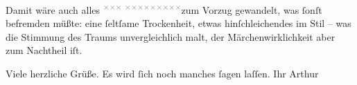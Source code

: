 \pstart
           Damit wäre auch alles \substVorne{}\textsuperscript{\textcolor{gray}{×}\-\textcolor{gray}{×}\-\textcolor{gray}{×}{ }\textcolor{gray}{×}\-\textcolor{gray}{×}\-\textcolor{gray}{×}\-\textcolor{gray}{×}\-\textcolor{gray}{×}\-\textcolor{gray}{×}\-\textcolor{gray}{×}\-\textcolor{gray}{×}\-\textcolor{gray}{×}}\substDazwischen{}zum Vorzug gewandelt\substHinten{}, was ſonſt befremden müßte: eine ſeltſame Trockenheit, etwas
               hinſchleichendes im Stil – was die Stimmung des Traums unvergleichlich malt, der
               Märchenwirklichkeit aber zum Nachtheil iſt.\pend
           
\pstart
           Viele herzliche Grüße. Es wird ſich noch manches ſagen laſſen.\pend
           \pstart Ihr \spacefill\mbox{Arthur}\pend{}\endnumbering{}  
      